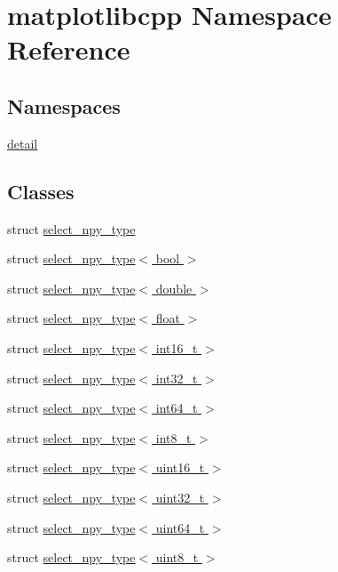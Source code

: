 \hypertarget{namespacematplotlibcpp}{}\section{matplotlibcpp Namespace Reference}
\label{namespacematplotlibcpp}
\subsection*{Namespaces}
\begin{DoxyCompactItemize}
\item 
 \hyperlink{namespacematplotlibcpp_1_1detail}{detail}
\end{DoxyCompactItemize}
\subsection*{Classes}
\begin{DoxyCompactItemize}
\item 
struct \hyperlink{structmatplotlibcpp_1_1select__npy__type}{select\+\_\+npy\+\_\+type}
\item 
struct \hyperlink{structmatplotlibcpp_1_1select__npy__type_3_01bool_01_4}{select\+\_\+npy\+\_\+type$<$ bool $>$}
\item 
struct \hyperlink{structmatplotlibcpp_1_1select__npy__type_3_01double_01_4}{select\+\_\+npy\+\_\+type$<$ double $>$}
\item 
struct \hyperlink{structmatplotlibcpp_1_1select__npy__type_3_01float_01_4}{select\+\_\+npy\+\_\+type$<$ float $>$}
\item 
struct \hyperlink{structmatplotlibcpp_1_1select__npy__type_3_01int16__t_01_4}{select\+\_\+npy\+\_\+type$<$ int16\+\_\+t $>$}
\item 
struct \hyperlink{structmatplotlibcpp_1_1select__npy__type_3_01int32__t_01_4}{select\+\_\+npy\+\_\+type$<$ int32\+\_\+t $>$}
\item 
struct \hyperlink{structmatplotlibcpp_1_1select__npy__type_3_01int64__t_01_4}{select\+\_\+npy\+\_\+type$<$ int64\+\_\+t $>$}
\item 
struct \hyperlink{structmatplotlibcpp_1_1select__npy__type_3_01int8__t_01_4}{select\+\_\+npy\+\_\+type$<$ int8\+\_\+t $>$}
\item 
struct \hyperlink{structmatplotlibcpp_1_1select__npy__type_3_01uint16__t_01_4}{select\+\_\+npy\+\_\+type$<$ uint16\+\_\+t $>$}
\item 
struct \hyperlink{structmatplotlibcpp_1_1select__npy__type_3_01uint32__t_01_4}{select\+\_\+npy\+\_\+type$<$ uint32\+\_\+t $>$}
\item 
struct \hyperlink{structmatplotlibcpp_1_1select__npy__type_3_01uint64__t_01_4}{select\+\_\+npy\+\_\+type$<$ uint64\+\_\+t $>$}
\item 
struct \hyperlink{structmatplotlibcpp_1_1select__npy__type_3_01uint8__t_01_4}{select\+\_\+npy\+\_\+type$<$ uint8\+\_\+t $>$}
\end{DoxyCompactItemize}
